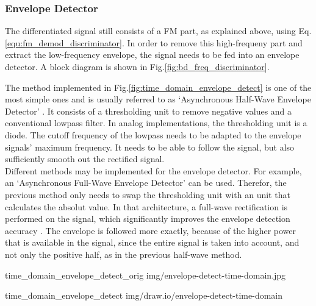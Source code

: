 \subsubsection{Envelope Detector}

The differentiated signal still consists of a FM part, as explained above, using Eq.\eqref{equ:fm_demod_discriminator}.
In order to remove this high-frequeny part and extract the low-frequency envelope, the signal needs to be fed into an envelope detector.
A block diagram is shown in Fig.\ref{fig:bd_freq_discriminator}.

The method implemented in Fig.\ref{fig:time_domain_envelope_detect} is one of the most simple ones and is usually referred to as `Asynchronous Half-Wave Envelope Detector' \cite{DSPRelatedEnvelopeDetection}.
It consists of a thresholding unit to remove negative values and a conventional lowpass filter.
In analog implementations, the thresholding unit is a diode.
The cutoff frequency of the lowpass needs to be adapted to the envelope signals' maximum frequency.
It needs to be able to follow the signal, but also sufficiently smooth out the rectified signal.\\

Different methods may be implemented for the envelope detector.
For example, an `Asynchronous Full-Wave Envelope Detector' can be used.
Therefor, the previous method only needs to swap the thresholding unit with an unit that calculates the absolut value.
In that architecture, a full-wave rectification is performed on the signal, which significantly improves the envelope detection accuracy \cite{DSPRelatedEnvelopeDetection}.
The envelope is followed more exactly, because of the higher power that is available in the signal, since the entire signal is taken into account, and not only the positive half, as in the previous half-wave method.

 {time_domain_envelope_detect_orig} {img/envelope-detect-time-domain.jpg}

 {time_domain_envelope_detect} {img/draw.io/envelope-detect-time-domain}

